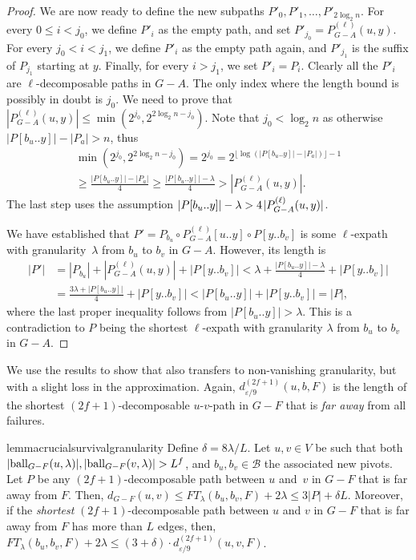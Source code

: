 \documentclass{theoretics}
\newcommand*{\B}{\mathcal{B}}
\newcommand*{\length}[1]{|#1|}
\newcommand*{\ball}{\mbox{\rm ball}}
\newcommand*{\nwspace}{\hspace*{.1em}}
\renewcommand{\geq}{\geqslant}
\renewcommand{\le}{\leqslant}
\newcommand{\eps}{\varepsilon}
\begin{document}
\begin{proof}
We are now ready to define the new subpaths $P'_0, P'_1, \ldots, P'_{2\log_2 n}$.
For every $0 \le i <j_0$, we define $P'_i$ as the empty path,
and set $P'_{j_0} = P^{(\ell)}_{G-A}(u,y)$. 
For every $j_0 < i < j_1$, we define $P'_i$ as the empty path again,
and $P'_{j_1}$ is the suffix of $P_{j_1}$ starting at $y$.
Finally, for every $i > j_1$, we set $P'_i = P_i$.
Clearly all the $P'_i$ are $\ell$-decomposable paths in $G - A$.
The only index where the length bound is possibly in doubt is $j_0$.
%
We need to prove that $\length{P^{(\ell)}_{G-A}(u,y)} \le \min(2^{j_0},2^{2\log_2 n - {j_0}})$.
Note that $j_0 < \log_2 n$ as otherwise $\length{P[b_u..y]}-\length{P_a} > n$,
thus
\begin{multline*}
	\min(2^{j_0},2^{2\log_2 n - {j_0}}) = 2^{j_0}
 	 = 2^{\lfloor\log(\length{P[b_u..y]}-\length{P_a})\rfloor -1}\\
 	\geq \frac{\length{P[b_u..y]} - \length{P_a}}{4} 
 	 \geq \frac{\length{P[b_u..y]} - \lambda}{4}
 	> \length{P^{(\ell)}_{G-A}(u,y)}.
\end{multline*}
The last step uses the assumption
$\length{P[b_u..y]}-\lambda > 4 \nwspace \length{P^{(\ell)}_{G-A}(u,y)}$.

We have established that $P'=P_{b_u} \circ P^{(\ell)}_{G-A}[u..y]\circ P[y..b_v]$
is some $\ell$-expath with granularity~$\lambda$ from $b_u$ to $b_v$ in $G-A$.
However, its length is
\begin{align*}
	\length{P'} &=\length{P_{b_u}} + \length{P^{(\ell)}_{G-A}(u,y)} + \length{P[y..b_v]}
		< \lambda + \frac{\length{P[b_u..y]}-\lambda}{4} + \length{P[y..b_v]}\\
		&= \frac{3\lambda + \length{P[b_u..y]}}{4} + \length{P[y..b_v]}
		< \length{P[b_u..y]}+\length{P[y..b_v]}=\length{P},
\end{align*}
where the last proper inequality follows from $|P[b_u..y]| > \lambda$.
This is a contradiction to $P$ being the shortest 
$\ell$-expath with granularity $\lambda$ from $b_u$ to $b_v$ in $G-A$.
\end{proof}

We use the results to show that also 
transfers to non-vanishing granularity, but with a slight loss in the approximation.
Again, $d^{(2f+1)}_{\eps/9}(u,b,F)$ is the length of the shortest $(2f{+}1)$-de\-com\-pos\-able
$u$-$v$-path in $G-F$ that is \emph{far away} from all failures.

\begin{restatable}{lemma}{crucialsurvivalgranularity}
\label{lem:crucial_survival_granularity}
  Define $\delta = 8\lambda/L$.
  Let $u,v \in V$ be such that both
  $|\ball_{G-F}(u,\lambda)|, |\ball_{G-F}(v,\lambda)| > L^f$,
  and  $b_u,b_v \in \B$ the associated new pivots.
  Let $P$ be any $(2f{+}1)$-de\-com\-pos\-able path between $u$ and~$v$ in $G-F$
  that is far away from $F$.
  Then,
  $d_{G-F}(u,v) \le FT_{\lambda}(b_u,b_v,F) + 2\lambda \le 3 \length{P} + \delta L$.
  Moreover, if the \emph{shortest} $(2f{+}1)$-de\-com\-pos\-able path between $u$ and $v$ in $G-F$ 
  that is far away from $F$ has more than $L$ edges,
  then,
  $FT_{\lambda}(b_u,b_v,F) + 2\lambda \le (3+\delta) \cdot d^{(2f+1)}_{\eps/9}(u,v,F)$.
\end{restatable}
\end{document}
